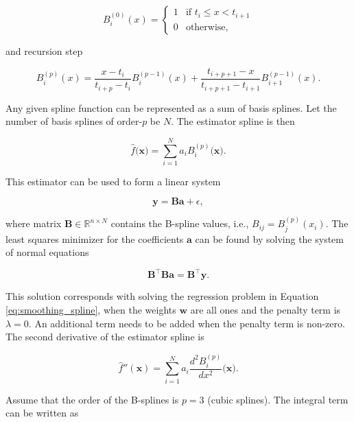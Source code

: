 \documentclass[a4paper]{artikel3}
\newcommand{\R}{\mathbb{R}}    %
\numberwithin{equation}{section}
\numberwithin{theorem}{section}
\numberwithin{proposition}{section}
\numberwithin{lemma}{section}
\begin{document}
\begin{equation*}
    B_i^{(0)}(x) = 
    \begin{cases}
        1 & \text{if } t_i \leq x < t_{i+1} \\
        0 & \text{otherwise},
    \end{cases}
\end{equation*}

and recursion step

\begin{equation*}
    B_i^{(p)}(x) = \frac{x - t_i}{t_{i + p} - t_{i}}B_i^{(p-1)}(x) + \frac{t_{i + p + 1} - x}{t_{i + p + 1} - t_{i + 1}}B_{i + 1}^{(p-1)}(x) .
\end{equation*}

Any given spline function can be represented as a sum of basis splines. Let the number of basis splines of order-$p$  be $N$. The estimator spline is then

\begin{equation*}
    \hat{f}(\mathbf{x)} = \sum_{i=1}^N a_i B_i^{(p)}(\mathbf{x)} .
\end{equation*}

This estimator can be used to form a linear system 

\begin{equation*}
    \mathbf{y} = \mathbf{B} \mathbf{a} + \epsilon ,
\end{equation*}

where matrix $\mathbf{B} \in \R^{n \times N}$ contains the B-spline values, i.e., $B_{ij} = B_j^{(p)}(x_i)$. The least squares minimizer for the coefficients $\mathbf{a}$ can be found by solving the system of normal equations

\begin{equation*}
    \mathbf{B}^\top \mathbf{B} \mathbf{a} = \mathbf{B}^\top \mathbf{y} .
\end{equation*}

This solution corresponds with solving the regression problem in Equation \eqref{eq:smoothing_spline}, when the weights $\mathbf{w}$ are all ones and the penalty term is $\lambda = 0$. An additional term needs to be added when the penalty term is non-zero. The second derivative of the estimator spline is 

\begin{equation*}
    \hat{f}''(\mathbf{x}) = \sum_{i=1}^N a_i \frac{d^2 B_i^{(p)}}{d x^2}(\mathbf{x)} .
\end{equation*}

Assume that the order of the B-splines is $p=3$ (cubic splines). The integral term can be written as
\end{document}
